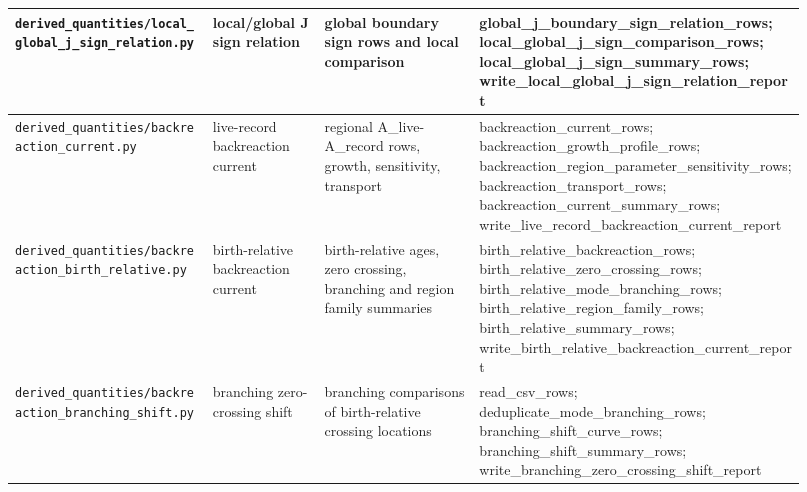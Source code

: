 \documentclass[11pt]{article}
\theoremstyle{remark}
\newcommand{\code}[1]{\texttt{#1}}
\numberwithin{equation}{section}
\begin{document}
\begin{longtable}{>{\raggedright\arraybackslash}p{0.23\linewidth}>{\raggedright\arraybackslash}p{0.13\linewidth}>{\raggedright\arraybackslash}p{0.18\linewidth}>{\raggedright\arraybackslash}p{0.38\linewidth}}
\hline
\code{derived\_\allowbreak{}quantities/local\_\allowbreak{}global\_\allowbreak{}j\_\allowbreak{}sign\_\allowbreak{}relation.py} & local/global J sign relation & global boundary sign rows and local comparison & global\_\allowbreak{}j\_\allowbreak{}boundary\_\allowbreak{}sign\_\allowbreak{}relation\_\allowbreak{}rows; local\_\allowbreak{}global\_\allowbreak{}j\_\allowbreak{}sign\_\allowbreak{}comparison\_\allowbreak{}rows; local\_\allowbreak{}global\_\allowbreak{}j\_\allowbreak{}sign\_\allowbreak{}summary\_\allowbreak{}rows; write\_\allowbreak{}local\_\allowbreak{}global\_\allowbreak{}j\_\allowbreak{}sign\_\allowbreak{}relation\_\allowbreak{}report\\
\hline
\code{derived\_\allowbreak{}quantities/backreaction\_\allowbreak{}current.py} & live-record backreaction current & regional A\_\allowbreak{}live-A\_\allowbreak{}record rows, growth, sensitivity, transport & backreaction\_\allowbreak{}current\_\allowbreak{}rows; backreaction\_\allowbreak{}growth\_\allowbreak{}profile\_\allowbreak{}rows; backreaction\_\allowbreak{}region\_\allowbreak{}parameter\_\allowbreak{}sensitivity\_\allowbreak{}rows; backreaction\_\allowbreak{}transport\_\allowbreak{}rows; backreaction\_\allowbreak{}current\_\allowbreak{}summary\_\allowbreak{}rows; write\_\allowbreak{}live\_\allowbreak{}record\_\allowbreak{}backreaction\_\allowbreak{}current\_\allowbreak{}report\\
\hline
\code{derived\_\allowbreak{}quantities/backreaction\_\allowbreak{}birth\_\allowbreak{}relative.py} & birth-relative backreaction current & birth-relative ages, zero crossing, branching and region family summaries & birth\_\allowbreak{}relative\_\allowbreak{}backreaction\_\allowbreak{}rows; birth\_\allowbreak{}relative\_\allowbreak{}zero\_\allowbreak{}crossing\_\allowbreak{}rows; birth\_\allowbreak{}relative\_\allowbreak{}mode\_\allowbreak{}branching\_\allowbreak{}rows; birth\_\allowbreak{}relative\_\allowbreak{}region\_\allowbreak{}family\_\allowbreak{}rows; birth\_\allowbreak{}relative\_\allowbreak{}summary\_\allowbreak{}rows; write\_\allowbreak{}birth\_\allowbreak{}relative\_\allowbreak{}backreaction\_\allowbreak{}current\_\allowbreak{}report\\
\hline
\code{derived\_\allowbreak{}quantities/backreaction\_\allowbreak{}branching\_\allowbreak{}shift.py} & branching zero-crossing shift & branching comparisons of birth-relative crossing locations & read\_\allowbreak{}csv\_\allowbreak{}rows; deduplicate\_\allowbreak{}mode\_\allowbreak{}branching\_\allowbreak{}rows; branching\_\allowbreak{}shift\_\allowbreak{}curve\_\allowbreak{}rows; branching\_\allowbreak{}shift\_\allowbreak{}summary\_\allowbreak{}rows; write\_\allowbreak{}branching\_\allowbreak{}zero\_\allowbreak{}crossing\_\allowbreak{}shift\_\allowbreak{}report\\

\end{longtable}
\end{document}

